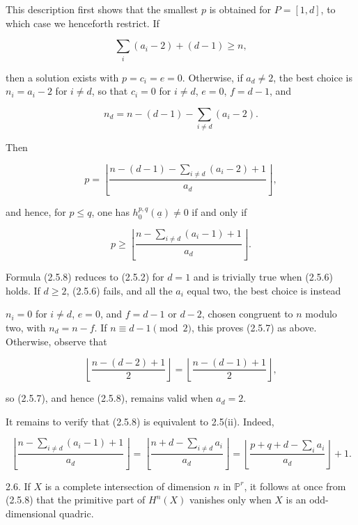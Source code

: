 This description first shows that the smallest $p$ is obtained for
$P=[1,d]$, to which case we henceforth restrict.  If

\begin{equation}\tag{2.5.6}
\sum_i(a_i-2)+(d-1)\geq n,
\end{equation}

then a solution exists with $p=c_i=e=0$.  Otherwise, if $a_d\ne2$, the
best choice is $n_i=a_i-2$ for $i\ne d$, so that $c_i=0$ for $i\ne d$,
$e=0$, $f=d-1$, and

\begin{equation*}
n_d=n-(d-1)-\sum_{i\ne d}(a_i-2).
\end{equation*}

Then

\begin{equation}\tag{2.5.7}
p=\left\lfloor
\frac{n-(d-1)-\sum_{i\ne d}(a_i-2)+1}{a_d}
\right\rfloor,
\end{equation}

and hence, for $p\leq q$, one has
$h_0^{p,q}(\underline a)\ne0$ if and only if

\begin{equation}\tag{2.5.8}
p\geq\left\lfloor
\frac{n-\sum_{i\ne d}(a_i-1)+1}{a_d}
\right\rfloor.
\end{equation}

Formula (2.5.8) reduces to (2.5.2) for $d=1$ and is trivially true when
(2.5.6) holds.  If $d\geq2$, (2.5.6) fails, and all the $a_i$ equal two,
the best choice is instead


$n_i=0$ for $i\ne d$, $e=0$, and $f=d-1$ or $d-2$, chosen congruent to
$n$ modulo two, with $n_d=n-f$.  If $n\equiv d-1\pmod2$, this proves
(2.5.7) as above.  Otherwise, observe that

\begin{equation*}
\left\lfloor\frac{n-(d-2)+1}{2}\right\rfloor
=\left\lfloor\frac{n-(d-1)+1}{2}\right\rfloor,
\end{equation*}

so (2.5.7), and hence (2.5.8), remains valid when $a_d=2$.

It remains to verify that (2.5.8) is equivalent to 2.5(ii).  Indeed,

\begin{equation*}
\left\lfloor\frac{n-\sum_{i\ne d}(a_i-1)+1}{a_d}\right\rfloor
=\left\lfloor\frac{n+d-\sum_{i\ne d}a_i}{a_d}\right\rfloor
=\left\lfloor\frac{p+q+d-\sum_i a_i}{a_d}\right\rfloor+1.
\end{equation*}

2.6. If $X$ is a complete intersection of dimension $n$ in
$\mathbb P^r$, it follows at once from (2.5.8) that the primitive part of
$H^n(X)$ vanishes only when $X$ is an odd-dimensional quadric.

